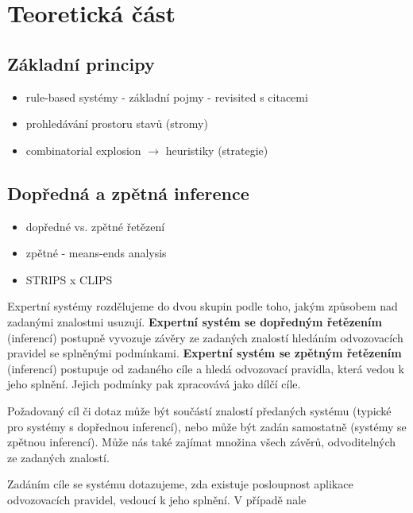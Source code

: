 \section{Teoretická část}



\subsection{Základní principy}
\begin{framed}
  \begin{itemize}
    \item rule-based systémy - základní pojmy - revisited s citacemi
    \item prohledávání prostoru stavů (stromy)
    \item combinatorial explosion $\rightarrow$ heuristiky (strategie)
  \end{itemize}
\end{framed}

\subsection{Dopředná a zpětná inference}
\begin{framed}
  \begin{itemize}
    \item dopředné vs. zpětné řetězení
    \item zpětné - means-ends analysis
    \item STRIPS x CLIPS
  \end{itemize}
\end{framed}

Expertní systémy rozdělujeme do dvou skupin podle toho, jakým způsobem nad
zadanými znalostmi usuzují. \textbf{Expertní systém se dopředným řetězením}
(inferencí) postupně vyvozuje závěry ze zadaných znalostí hledáním odvozovacích
pravidel se splněnými podmínkami. \textbf{Expertní systém se zpětným řetězením}
(inferencí) postupuje od zadaného cíle a hledá odvozovací pravidla, která vedou
k jeho splnění. Jejich podmínky pak zpracovává jako dílčí cíle.

Požadovaný cíl či dotaz může být součástí znalostí předaných systému (typické
pro systémy s dopřednou inferencí), nebo může být zadán samostatně (systémy se
zpětnou inferencí). Může nás také zajímat množina všech závěrů, odvoditelných ze
zadaných znalostí.

Zadáním cíle se systému dotazujeme, zda existuje posloupnost aplikace
odvozovacích pravidel, vedoucí k jeho splnění. V případě nale


